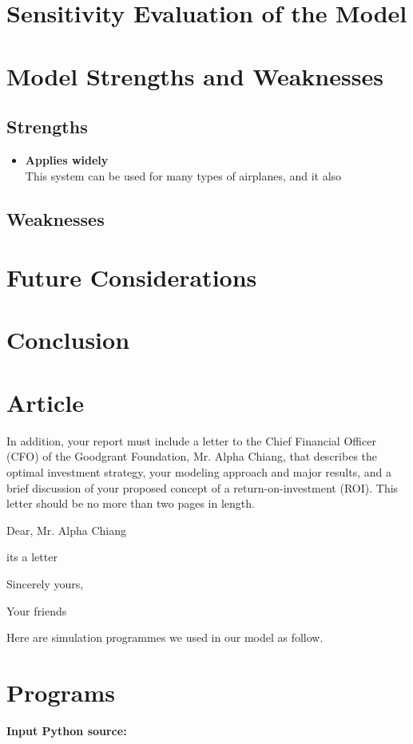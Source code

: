 \documentclass{mcmthesis}
\begin{document}
\section{Sensitivity Evaluation of the Model}
\section{Model Strengths and Weaknesses}
\subsection{Strengths}
\begin{itemize}
\item \textbf{Applies widely}\\
This system can be used for many types of airplanes, and it also
\end{itemize}
\subsection{Weaknesses}

\section{Future Considerations}
\section{Conclusion}

{}



\begin{appendices}

\section{Article}

In addition, your report must include a letter to the Chief Financial Officer (CFO) of the Goodgrant Foundation, Mr. Alpha Chiang, that describes the optimal investment strategy, your modeling approach and major results, and a brief discussion of your proposed concept of a return-on-investment (ROI). This letter should be no more than two pages in length.

\begin{letter}{Dear, Mr. Alpha Chiang}

its a letter

\vspace{\parskip}

Sincerely yours,

Your friends

\end{letter}
Here are simulation programmes we used in our model as follow.\\

\section{Programs}
\textbf{\textcolor[rgb]{0.98,0.00,0.00}{Input Python source:}}

\end{appendices}
\end{document}
